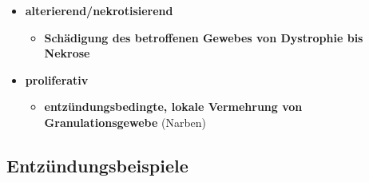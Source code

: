 \begin{itemize}
\begin{itemize}
				\item \textbf{alterierend/nekrotisierend}
					\begin{itemize}
						\item \textbf{Schädigung des betroffenen Gewebes von Dystrophie bis Nekrose}
					\end{itemize}
				\item \textbf{proliferativ}
					\begin{itemize}
						\item \textbf{entzündungsbedingte, lokale Vermehrung von Granulationsgewebe} (Narben)
					\end{itemize}
			\end{itemize}
		\end{itemize}
	\subsection{Entzündungsbeispiele}
